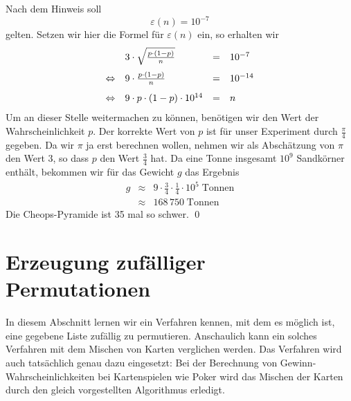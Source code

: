 \solution
Nach dem Hinweis soll 
\[ \varepsilon(n) = 10^{-7} \]
gelten. Setzen wir hier die Formel f\"ur $\varepsilon(n)$ ein, so erhalten wir
\[  
\begin{array}[t]{llcl}
                & 3 \cdot \sqrt{\frac{p \cdot (1 - p)}{n}} & = & 10^{-7}   \\[0.3cm]
\Leftrightarrow & 9 \cdot        \frac{p \cdot (1 - p)}{n} & = & 10^{-14}      \\[0.3cm]
\Leftrightarrow & 9 \cdot    p \cdot (1 - p) \cdot 10^{14} & = & n 
\end{array}
\]
Um an dieser Stelle weitermachen zu k\"onnen, ben\"otigen wir den Wert der Wahrscheinlichkeit $p$.  Der korrekte
Wert von $p$ ist f\"ur unser Experiment durch $\frac{\pi}{4}$ gegeben.  Da wir $\pi$ ja erst berechnen wollen,
nehmen wir als Absch\"atzung von $\pi$ den Wert $3$, so dass $p$ den Wert $\frac{3}{4}$ hat.  Da eine Tonne
insgesamt $10^9$ Sandk\"orner enth\"alt, bekommen wir f\"ur das Gewicht $g$ das Ergebnis
\begin{eqnarray*}
g & \approx & 9 \cdot \frac{3}{4} \cdot \frac{1}{4} \cdot 10^5\; \mbox{Tonnen} \\[0.2cm]
  & \approx & 168\,750 \; \mbox{Tonnen} 
\end{eqnarray*}
Die Cheops-Pyramide ist 35 mal so schwer. \qed

\section{Erzeugung zuf\"alliger Permutationen}
In diesem Abschnitt lernen wir ein Verfahren kennen, mit dem es m\"oglich ist, eine gegebene
Liste zuf\"allig zu permutieren.  Anschaulich kann ein solches Verfahren mit dem Mischen von
Karten verglichen werden.  Das Verfahren wird auch tats\"achlich genau dazu eingesetzt:
Bei der Berechnung von Gewinn-Wahrscheinlichkeiten bei Kartenspielen wie Poker wird das
Mischen der Karten durch den gleich vorgestellten Algorithmus erledigt.  

